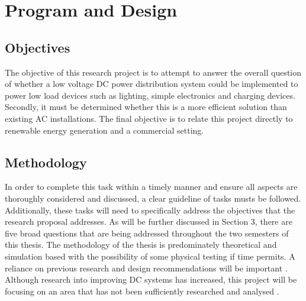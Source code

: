 \section{Program and Design}  


\subsection{Objectives}

The objective of this research project is to attempt to answer the overall question of whether a low voltage DC power distribution system could be implemented to power low load devices such as lighting, simple electronics and charging devices. Secondly, it must be determined whether this is a more efficient solution than existing AC installations. The final objective is to relate this project directly to renewable energy generation and a commercial setting.

\subsection{Methodology}

In order to complete this task within a timely manner and ensure all aspects are thoroughly considered and discussed, a clear guideline of tasks musts be followed. Additionally, these tasks will need to specifically address the objectives that the research proposal addresses. As will be further discussed in Section 3, there are five broad questions that are being addressed throughout the two semesters of this thesis. The methodology of the thesis is predominately theoretical and simulation based with the possibility of some physical testing if time permits. A reliance on previous research and design recommendations will be important \cite{Amin2011}. Although research into improving DC systems has increased, this project will be focusing on an area that has not been sufficiently researched and analysed \cite{Pellis1997}.   
\newline

